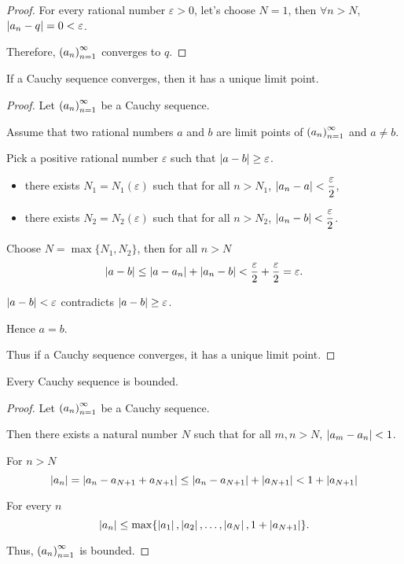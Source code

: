 \begin{proof}
    For every rational number $\varepsilon > 0$, let's choose $N = 1$, then $\forall n > N$, $\left\vert{a_{n} - q}\right\vert = 0 < \varepsilon$.

    Therefore, ${\left({a_{n}}\right)}^{\infty}_{n=1}$ converges to $q$.
\end{proof}

\begin{theorem}
    If a Cauchy sequence converges, then it has a unique limit point.
\end{theorem}

\begin{proof}
    Let ${\left({a_{n}}\right)}^{\infty}_{n=1}$ be a Cauchy sequence.

    Assume that two rational numbers $a$ and $b$ are limit points of ${\left({a_{n}}\right)}^{\infty}_{n=1}$ and $a\ne b$.

    Pick a positive rational number $\varepsilon$ such that $\left\vert{a - b}\right\vert\ge\varepsilon$.
    \begin{itemize}
        \item there exists $N_{1} = N_{1}(\varepsilon)$ such that for all $n > N_{1}$, $\left\vert{a_{n} - a}\right\vert < \dfrac{\varepsilon}{2}$,
        \item there exists $N_{2} = N_{2}(\varepsilon)$ such that for all $n > N_{2}$, $\left\vert{a_{n} - b}\right\vert < \dfrac{\varepsilon}{2}$.
    \end{itemize}

    Choose $N = \max\{ N_{1}, N_{2} \}$, then for all $n > N$
    \[
        \left\vert{a - b}\right\vert\le \left\vert{a - a_{n}}\right\vert + \left\vert{a_{n} - b}\right\vert < \frac{\varepsilon}{2} + \frac{\varepsilon}{2} = \varepsilon.
    \]

    $\left\vert{a - b}\right\vert < \varepsilon$ contradicts $\left\vert{a - b}\right\vert\ge\varepsilon$.

    Hence $a = b$.

    Thus if a Cauchy sequence converges, it has a unique limit point.
\end{proof}

\begin{theorem}
    Every Cauchy sequence is bounded.
\end{theorem}

\begin{proof}
    Let ${\left({a_{n}}\right)}^{\infty}_{n=1}$ be a Cauchy sequence.

    Then there exists a natural number $N$ such that for all $m, n > N$, $\left\vert{a_{m} - a_{n}}\right\vert < 1$.

    For $n > N$
    \[
        \left\vert{a_{n}}\right\vert = \left\vert{a_{n} - a_{N+1} + a_{N+1}}\right\vert\le \left\vert{a_{n} - a_{N+1}}\right\vert + \left\vert{a_{N+1}}\right\vert < 1 + \left\vert{a_{N+1}}\right\vert
    \]

    For every $n$
    \[
        \left\vert{a_{n}}\right\vert\le \max\{ \left\vert{a_{1}}\right\vert, \left\vert{a_{2}}\right\vert, \ldots, \left\vert{a_{N}}\right\vert, 1 + \left\vert{a_{N+1}}\right\vert \}.
    \]

    Thus, ${\left({a_{n}}\right)}^{\infty}_{n=1}$ is bounded.
\end{proof}

